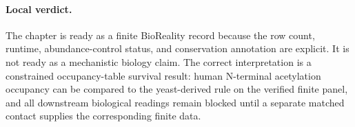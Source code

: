 \paragraph{Local verdict.}
The chapter is ready as a finite BioReality record because the row count, runtime, abundance-control status, and conservation annotation are explicit. It is not ready as a mechanistic biology claim. The correct interpretation is a constrained occupancy-table survival result: human N-terminal acetylation occupancy can be compared to the yeast-derived rule on the verified finite panel, and all downstream biological readings remain blocked until a separate matched contact supplies the corresponding finite data.
